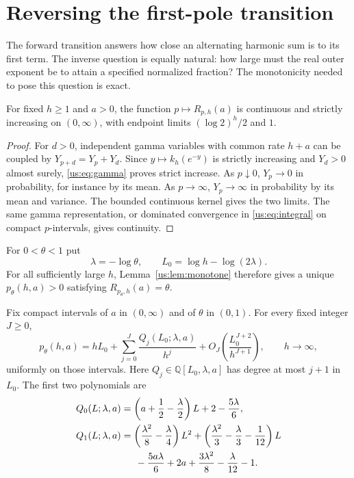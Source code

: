 \section{Reversing the first-pole transition}
\label{us:sec:inverse}

The forward transition answers how close an alternating harmonic sum
is to its first term. The inverse question is equally natural: how
large must the real outer exponent be to attain a specified normalized
fraction? The monotonicity needed to pose this question is exact.

\begin{lemma}
\label{us:lem:monotone}
For fixed $h\ge1$ and $a>0$, the function $p\mapsto R_{p,h}(a)$
is continuous and strictly increasing on $(0,\infty)$, with endpoint
limits $(\log2)^h/2$ and $1$.
\end{lemma}
\begin{proof}
For $d>0$, independent gamma variables with common rate $h+a$
can be coupled by $Y_{p+d}=Y_p+Y_d$. Since
$y\mapsto k_h(e^{-y})$ is strictly increasing and $Y_d>0$
almost surely, \eqref{us:eq:gamma} proves strict increase.
As $p\downarrow0$, $Y_p\to0$ in probability, for instance by its
mean. As $p\to\infty$, $Y_p\to\infty$ in probability by its
mean and variance. The bounded continuous kernel gives the two
limits. The same gamma representation, or dominated convergence
in \eqref{us:eq:integral} on compact $p$-intervals, gives continuity.
\end{proof}

For $0<\theta<1$ put
\begin{equation}\label{us:eq:inverse-parameters}
 \lambda=-\log\theta,
 \qquad L_0=\log h-\log(2\lambda).
\end{equation}
For all sufficiently large $h$, Lemma~\ref{us:lem:monotone}
therefore gives a unique $p_\theta(h,a)>0$ satisfying
$R_{p_\theta,h}(a)=\theta$.

\begin{theorem}
\label{us:thm:inverse}
Fix compact intervals of $a$ in $(0,\infty)$ and of $\theta$
in $(0,1)$. For every fixed integer $J\ge0$,
\begin{equation}\label{us:eq:inverse-all}
 p_\theta(h,a)=hL_0+
   \sum_{j=0}^J\frac{Q_j(L_0;\lambda,a)}{h^j}
   +O_J\!\left(\frac{L_0^{J+2}}{h^{J+1}}\right),
 \qquad h\to\infty,
\end{equation}
uniformly on those intervals. Here $Q_j\in\mathbb Q[L_0,\lambda,a]$
has degree at most $j+1$ in $L_0$. The first two polynomials are
\begin{align}
 Q_0(L;\lambda,a)
  & =\left(a+\frac12-\frac\lambda2\right)L
       +2-\frac{5\lambda}{6},\label{us:eq:Q0}\\
 Q_1(L;\lambda,a)
  & =\left(\frac{\lambda^2}{8}-\frac\lambda4\right)L^2
    +\left(\frac{\lambda^2}{3}-\frac\lambda3-\frac1{12}\right)L
       \notag\\
  &\hspace{1.5em}-\frac{5a\lambda}{6}+2a
       +\frac{3\lambda^2}{8}-\frac\lambda{12}-1.
       \label{us:eq:Q1}
\end{align}
\end{theorem}

